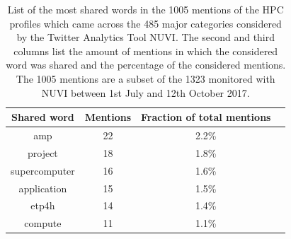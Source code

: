 \begin{table}[t]
 \begin{center}
  \begin{tabular}{cccc}
   \hline 
   \hline
   Shared word & Mentions & Fraction of total mentions \\ 
   \hline
   \hline
   amp & 22 & 2.2\% \\
   project & 18 & 1.8\% \\
   supercomputer & 16 & 1.6\% \\
   application & 15 & 1.5\% \\
   etp4h & 14 & 1.4\% \\
   compute & 11 & 1.1\% \\
   \hline
   \hline
  \end{tabular}
 \end{center} 
 \caption{List of the most shared words in the 1005 mentions of the HPC profiles which came across the 485 major categories considered by the Twitter Analytics Tool NUVI. The second and third columns list the amount of mentions in which the considered word was shared and the percentage of the considered mentions. The 1005 mentions are a subset of the 1323 monitored with NUVI between 1st July and 12th October 2017.}
\label{Most_shared_words} 
\end{table}

